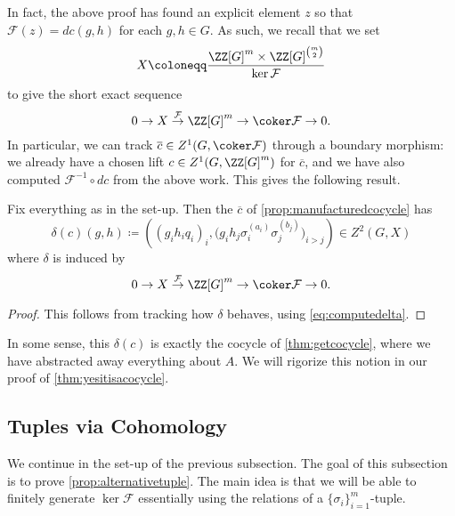 \documentclass{article}
\numberwithin{equation}{section}
\begin{document}
In fact, the above proof has found an explicit element $z$ so that $\mathcal F(z)=dc(g,h)$ for each $g,h\in G$. As such, we recall that we set
\[X\coloneqq\frac{\ZZ[G]^m\times\ZZ[G]^{\binom m2}}{\ker\mathcal F}\]
to give the short exact sequence
\[0\to X\stackrel{\mathcal F}\to\ZZ[G]^m\to\coker\mathcal F\to0.\]
In particular, we can track $\overline c\in Z^1(G,\coker\mathcal F)$ through a boundary morphism: we already have a chosen lift $c\in Z^1(G,\ZZ[G]^m)$ for $\overline c$, and we have also computed $\mathcal F^{-1}\circ dc$ from the above work. This gives the following result.
\begin{cor} \label{cor:deltaccomputation}
	Fix everything as in the set-up. Then the $\overline c$ of \autoref{prop:manufacturedcocycle} has
	\[\delta(c)(g,h)\coloneqq\left((g_ih_iq_i)_i,\big(g_ih_j\sigma_i^{(a_i)}\sigma_j^{(b_j)}\big)_{i>j}\right)\in Z^2(G,X)\]
	where $\delta$ is induced by
	\[0\to X\stackrel{\mathcal F}\to\ZZ[G]^m\to\coker\mathcal F\to0.\]
\end{cor}
\begin{proof}
	This follows from tracking how $\delta$ behaves, using \autoref{eq:computedelta}.
\end{proof}
\begin{remark}
	In some sense, this $\delta(c)$ is exactly the cocycle of \autoref{thm:getcocycle}, where we have abstracted away everything about $A$. We will rigorize this notion in our proof of \autoref{thm:yesitisacocycle}.
\end{remark}

\subsection{Tuples via Cohomology}
We continue in the set-up of the previous subsection. The goal of this subsection is to prove \autoref{prop:alternativetuple}. The main idea is that we will be able to finitely generate $\ker\mathcal F$ essentially using the relations of a $\{\sigma_i\}_{i=1}^m$-tuple.
\end{document}
